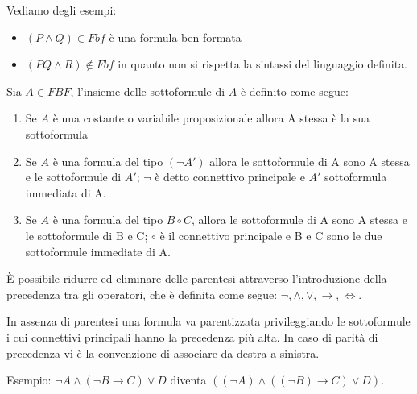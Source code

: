 \documentclass[a4paper,12pt, oneside]{book}
\begin{document}
\begin{esempio}
  Vediamo degli esempi:
  \begin{itemize}
    \item $(P \land Q) \in Fbf$  è una formula ben formata\newline
    \item $(PQ \land R) \not \in Fbf$ in quanto non si rispetta la sintassi del
    linguaggio 
    definita. 
  \end{itemize}
\end{esempio}
\begin{definizione}

  Sia $A \in FBF$, l'insieme delle sottoformule di $A$ è definito come segue:
  \begin{enumerate}
    \item Se $A$ è una costante o variabile proposizionale allora A stessa è la
    sua 
    sottoformula 
    \item Se $A$ è una formula del tipo $(\neg A')$ allora le sottoformule di A
    sono 
    A stessa e le sottoformule di $A'$; 
    $\neg$ è detto connettivo principale e $A'$ sottoformula immediata di A.
    \item Se $A$ è una formula del tipo $B \circ C$, allora le sottoformule di A
    sono A stessa 
    e le sottoformule di B e C; $\circ$ è il connettivo principale e B e C sono
    le due sottoformule immediate di A. 
  \end{enumerate}

\end{definizione}
È possibile ridurre ed eliminare delle parentesi attraverso l'introduzione della
precedenza tra gli operatori, che è definita come segue:\newline
$\neg, \land, \lor, \rightarrow,\iff$.

In assenza di parentesi una formula va parentizzata privileggiando le
sottoformule 
i cui connettivi principali hanno la precedenza più alta.\newline
In caso di parità di precedenza vi è la convenzione di associare da destra a
sinistra. 

Esempio:\newline
$\neg A \land (\neg B \rightarrow C) \lor D$ diventa
$((\neg A) \land ((\neg B) \rightarrow C) \lor D)$.
\end{document}
